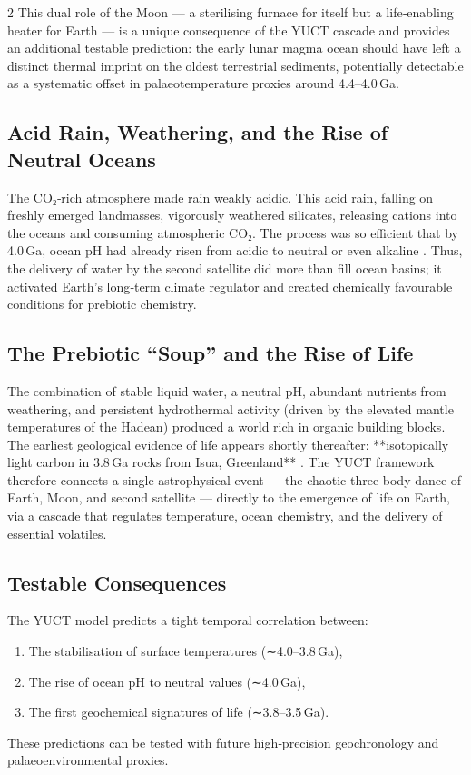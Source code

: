 \documentclass[11pt,a4paper]{article}
\begin{document}
\begin{multicols}{2}
		This dual role of the Moon — a sterilising furnace for itself but a 
		life‑enabling heater for Earth — is a unique consequence of the YUCT 
		cascade and provides an additional testable prediction: the early lunar 
		magma ocean should have left a distinct thermal imprint on the oldest 
		terrestrial sediments, potentially detectable as a systematic offset in 
		palaeotemperature proxies around 4.4–4.0 Ga.
		
		\subsection{Acid Rain, Weathering, and the Rise of Neutral Oceans}
		
		The CO₂‑rich atmosphere made rain weakly acidic. This acid rain, falling on 
		freshly emerged landmasses, vigorously weathered silicates, releasing cations 
		into the oceans and consuming atmospheric CO₂. The process was so efficient that 
		by 4.0 Ga, ocean pH had already risen from acidic to neutral or even alkaline 
		\cite{KrissansenTotton2019}. Thus, the delivery of water by the second satellite 
		did more than fill ocean basins; it activated Earth’s long‑term climate 
		regulator and created chemically favourable conditions for prebiotic chemistry.
		
		\subsection{The Prebiotic “Soup” and the Rise of Life}
		
		The combination of stable liquid water, a neutral pH, abundant nutrients from 
		weathering, and persistent hydrothermal activity (driven by the elevated mantle 
		temperatures of the Hadean) produced a world rich in organic building blocks. 
		The earliest geological evidence of life appears shortly thereafter: 
		**isotopically light carbon in 3.8 Ga rocks from Isua, Greenland** 
		\cite{Arndt2012}. The YUCT framework therefore connects a single astrophysical 
		event — the chaotic three‑body dance of Earth, Moon, and second satellite — 
		directly to the emergence of life on Earth, via a cascade that regulates 
		temperature, ocean chemistry, and the delivery of essential volatiles.
		
		\subsection{Testable Consequences}
		
		The YUCT model predicts a tight temporal correlation between:
		\begin{enumerate}
			\item The stabilisation of surface temperatures (∼4.0–3.8 Ga),
			\item The rise of ocean pH to neutral values (∼4.0 Ga),
			\item The first geochemical signatures of life (∼3.8–3.5 Ga).
		\end{enumerate}
		These predictions can be tested with future high‑precision geochronology and 
		palaeoenvironmental proxies.
	\end{multicols}
\end{document}
